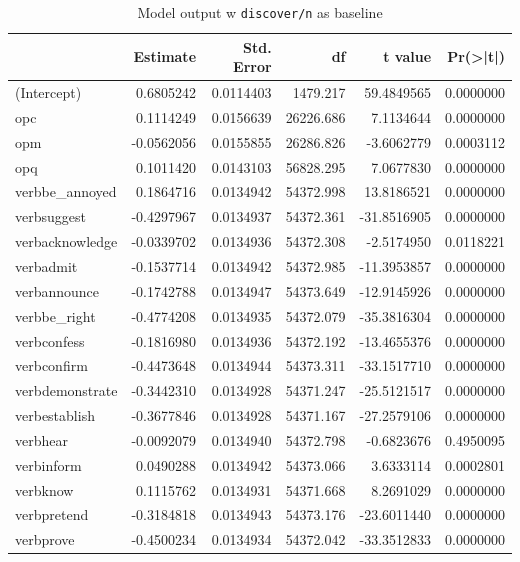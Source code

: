 \documentclass[12pt, a4paper]{article}
\begin{document}
\begin{table}[ht]
	\caption{Model output w \texttt{discover/n} as baseline}
	\label{tab:discover-n}
	\centering

	\begin{tabular}{lrrrrr}
		\toprule
		  & Estimate & Std. Error & df & t value & Pr(>|t|)\\
		\midrule
		(Intercept) & 0.6805242 & 0.0114403 & 1479.217 & 59.4849565 & 0.0000000\\
		opc & 0.1114249 & 0.0156639 & 26226.686 & 7.1134644 & 0.0000000\\
		opm & -0.0562056 & 0.0155855 & 26286.826 & -3.6062779 & 0.0003112\\
		opq & 0.1011420 & 0.0143103 & 56828.295 & 7.0677830 & 0.0000000\\
		verbbe\_annoyed & 0.1864716 & 0.0134942 & 54372.998 & 13.8186521 & 0.0000000\\
		\addlinespace
		verbsuggest & -0.4297967 & 0.0134937 & 54372.361 & -31.8516905 & 0.0000000\\
		verbacknowledge & -0.0339702 & 0.0134936 & 54372.308 & -2.5174950 & 0.0118221\\
		verbadmit & -0.1537714 & 0.0134942 & 54372.985 & -11.3953857 & 0.0000000\\
		verbannounce & -0.1742788 & 0.0134947 & 54373.649 & -12.9145926 & 0.0000000\\
		verbbe\_right & -0.4774208 & 0.0134935 & 54372.079 & -35.3816304 & 0.0000000\\
		\addlinespace
		verbconfess & -0.1816980 & 0.0134936 & 54372.192 & -13.4655376 & 0.0000000\\
		verbconfirm & -0.4473648 & 0.0134944 & 54373.311 & -33.1517710 & 0.0000000\\
		verbdemonstrate & -0.3442310 & 0.0134928 & 54371.247 & -25.5121517 & 0.0000000\\
		verbestablish & -0.3677846 & 0.0134928 & 54371.167 & -27.2579106 & 0.0000000\\
		verbhear & -0.0092079 & 0.0134940 & 54372.798 & -0.6823676 & 0.4950095\\
		\addlinespace
		verbinform & 0.0490288 & 0.0134942 & 54373.066 & 3.6333114 & 0.0002801\\
		verbknow & 0.1115762 & 0.0134931 & 54371.668 & 8.2691029 & 0.0000000\\
		verbpretend & -0.3184818 & 0.0134943 & 54373.176 & -23.6011440 & 0.0000000\\
		verbprove & -0.4500234 & 0.0134934 & 54372.042 & -33.3512833 & 0.0000000\\

\end{tabular}
\end{table}
\end{document}
